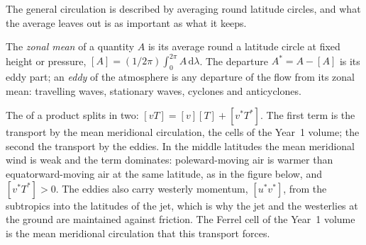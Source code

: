 The general circulation is described by averaging round latitude circles,
and what the average leaves out is as important as what it keeps.

\begin{definition}\label{def:b3:atmospheric-dynamics:eddy}
The \emph{zonal mean} of a quantity $A$ is its average
round a latitude circle at fixed height or pressure, $[A] =
(1/2\pi)\int_0^{2\pi} A\,\mathrm d\lambda$. The departure $A^* = A - [A]$
is its eddy part; an \emph{eddy} of the
atmosphere is any departure of the flow from its zonal mean: travelling
waves, stationary waves, cyclones and anticyclones.
\end{definition}

The  of a product splits in two: $[vT] = [v][T] + [v^*T^*]$. The
first term is the transport by the mean meridional circulation, the cells
of the Year~1 volume; the second the transport by the eddies. In the
middle latitudes the mean meridional wind is weak and the  term
dominates: poleward-moving air is warmer than equatorward-moving air at the
same latitude, as in the figure below, and $[v^*T^*] > 0$. The eddies also
carry westerly momentum, $[u^*v^*]$, from the subtropics into the latitudes
of the jet, which is why the jet and the westerlies at the ground are
maintained against friction. The Ferrel cell of the Year~1 volume is the
mean meridional circulation that this  transport forces.

\begin{omfigure}

\par{}\label{fig:b3:atmospheric-dynamics:heatflux}
\end{omfigure}


